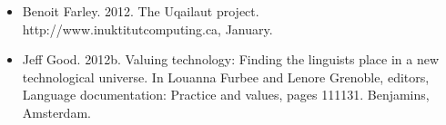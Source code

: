 \documentclass{beamer}
\begin{document}
\begin{frame}
\begin{itemize}
\item Benoit Farley. 2012. The Uqailaut project. http://www.inuktitutcomputing.ca, January.
  \item Jeff Good. 2012b. Valuing technology: Finding the linguists place in a new technological universe. In Louanna Furbee and Lenore Grenoble, editors, Language documentation: Practice and values, pages 111131. Benjamins, Amsterdam.

\end{itemize}
\end{frame}
\end{document}

